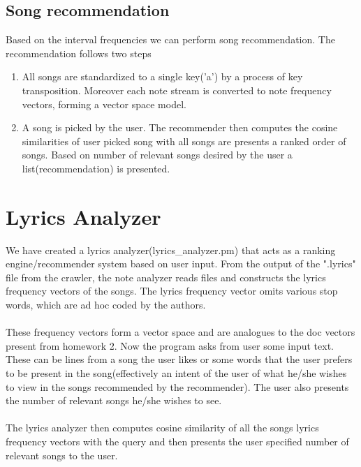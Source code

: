 \documentclass[letterpaper, 11pt]{article}
\begin{document}
\subsection*{Song recommendation}
Based on the interval frequencies we can perform song recommendation. The recommendation follows two steps
\begin{enumerate}
\item All songs are standardized to a single key('a') by a process of key transposition. Moreover each note stream is converted to note frequency vectors, forming a vector space model. 
\item A song is picked by the user. The recommender then computes the cosine similarities of user picked song with all songs are presents a ranked order of songs. Based on number of relevant songs desired by the user a list(recommendation) is presented.
\end{enumerate}

\section*{Lyrics Analyzer}
We have created a lyrics analyzer(lyrics\_analyzer.pm) that acts as a ranking engine/recommender system based on user input. From the output of the ".lyrics" file from the crawler, the note analyzer reads files and constructs the lyrics frequency vectors of the songs. The lyrics frequency vector omits various stop words, which are ad hoc coded by the authors. \\\\
These frequency vectors form a vector space and are analogues to the doc vectors present from homework 2. Now the program asks from user some input text. These can be lines from a song the user likes or some words that the user prefers to be present in the song(effectively an intent of the user of what he/she wishes to view in the songs recommended by the recommender). The user also presents the number of relevant songs he/she wishes to see. \\\\
The lyrics analyzer then computes cosine similarity of all the songs lyrics frequency vectors with the query and then presents the user specified number of relevant songs to the user. 
\end{document}
